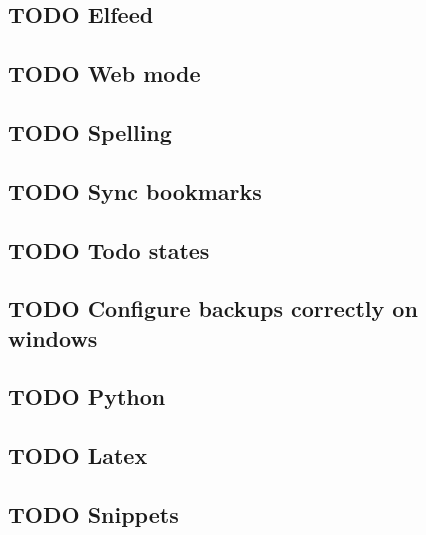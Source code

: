 \documentclass[11pt]{article}
\begin{document}
\subsection{{\bfseries\sffamily TODO} Elfeed}
\label{sec:org6d739c4}
\subsection{{\bfseries\sffamily TODO} Web mode}
\label{sec:org15dd684}
\subsection{{\bfseries\sffamily TODO} Spelling}
\label{sec:orga3c78a2}
\subsection{{\bfseries\sffamily TODO} Sync bookmarks}
\label{sec:org3e9589b}
\subsection{{\bfseries\sffamily TODO} Todo states}
\label{sec:orgebcae7b}
\subsection{{\bfseries\sffamily TODO} Configure backups correctly on windows}
\label{sec:org49322aa}
\subsection{{\bfseries\sffamily TODO} Python}
\label{sec:org3a95cf9}
\subsection{{\bfseries\sffamily TODO} Latex}
\label{sec:orgd5fe446}
\subsection{{\bfseries\sffamily TODO} Snippets}
\label{sec:orgc1c0830}
\end{document}
